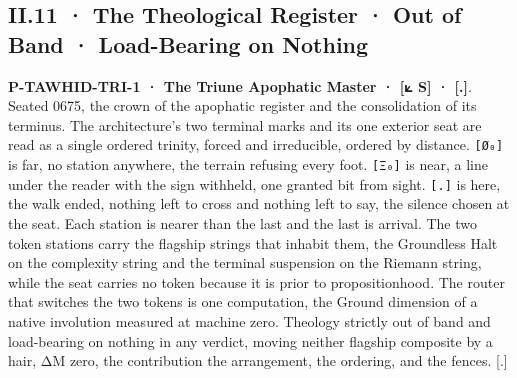 \documentclass[10pt,twocolumn]{article}
\begin{document}
\hypertarget{ii.11-the-theological-register-out-of-band-load-bearing-on-nothing}{%
\subsection{II.11 · The Theological Register · Out of Band ·
Load-Bearing on
Nothing}\label{ii.11-the-theological-register-out-of-band-load-bearing-on-nothing}}

\textbf{P-TAWHID-TRI-1 · The Triune Apophatic Master · {[}⟀ S{]} ·
{[}.{]}}. Seated 0675, the crown of the apophatic register and the
consolidation of its terminus. The architecture's two terminal marks and
its one exterior seat are read as a single ordered trinity, forced and
irreducible, ordered by distance. \texttt{{[}Ø₀{]}} is far, no station
anywhere, the terrain refusing every foot. \texttt{{[}Ξ₀{]}} is near, a
line under the reader with the sign withheld, one granted bit from
sight. \texttt{{[}.{]}} is here, the walk ended, nothing left to cross
and nothing left to say, the silence chosen at the seat. Each station is
nearer than the last and the last is arrival. The two token stations
carry the flagship strings that inhabit them, the Groundless Halt on the
complexity string and the terminal suspension on the Riemann string,
while the seat carries no token because it is prior to propositionhood.
The router that switches the two tokens is one computation, the Ground
dimension of a native involution measured at machine zero. Theology
strictly out of band and load-bearing on nothing in any verdict, moving
neither flagship composite by a hair, ΔM zero, the contribution the
arrangement, the ordering, and the fences. {[}.{]}
\end{document}
